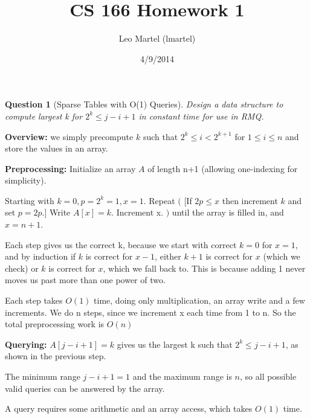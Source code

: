 \documentclass{article}
\title{CS 166 Homework 1}
\author{Leo Martel (lmartel)}
\date{4/9/2014}
\newtheorem{ques}{Question}
\renewcommand{\b}[1]{\textbf{#1}}
\begin{document}
\maketitle

\begin{ques}[Sparse Tables with O(1) Queries]
Design a data structure to compute largest k for $2^k \le j - i + 1$ in constant time for use in RMQ.
\end{ques}
\b{Overview:} we simply precompute $k$ such that $2^k \le i < 2^{k+1}$ for $1 \le i \le n$ and store the values in an array.

\b{Preprocessing:} Initialize an array $A$ of length n+1 (allowing one-indexing for simplicity). 

Starting with $k = 0, p = 2^k = 1, x = 1$. Repeat $\big($ [If $2p \le x$ then increment $k$ and set $p = 2p$.] Write $A[x] = k$. Increment x. $\big)$ until the array is filled in, and $x = n + 1$.

Each step gives us the correct k, because we start with correct $k=0$ for $x=1$, and by induction if $k$ is correct for $x - 1$, either $k+1$ is correct for $x$ (which we check) or $k$ is correct for $x$, which we fall back to. This is because adding 1 never moves us past more than one power of two.

Each step takes $O(1)$ time, doing only multiplication, an array write and a few increments. We do n steps, since we increment x each time from 1 to n. So the total preprocessing work is $O(n)$

\b{Querying:} $A[j - i + 1] = k$ gives us the largest k such that $2^k \le j - i + 1$, as shown in the previous step.

The minimum range $j - i + 1 = 1$ and the maximum range is $n$, so all possible valid queries can be answered by the array.

A query requires some arithmetic and an array access, which takes $O(1)$ time.
\end{document}
